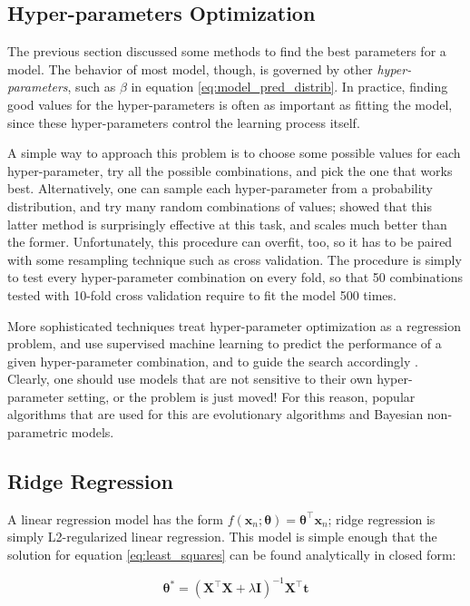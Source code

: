 \documentclass[a4paper,11pt]{kth-mag}
\begin{document}
\subsection{Hyper-parameters Optimization}
The previous section discussed some methods to find the best parameters for a model. The behavior of most model, though, is governed by other \emph{hyper-parameters}, such as $\beta$ in equation \ref{eq:model_pred_distrib}. In practice, finding good values for the hyper-parameters is often as important as fitting the model, since these hyper-parameters control the learning process itself.

A simple way to approach this problem is to choose some possible values for each hyper-parameter, try all the possible combinations, and pick the one that works best. Alternatively, one can sample each hyper-parameter from a probability distribution, and try many random combinations of values; \cite{random_search} showed that this latter method is surprisingly effective at this task, and scales much better than the former. Unfortunately, this procedure can overfit, too, so it has to be paired with some resampling technique such as cross validation. The procedure is simply to test every hyper-parameter combination on every fold, so that 50 combinations tested with 10-fold cross validation require to fit the model 500 times.

More sophisticated techniques treat hyper-parameter optimization as a regression problem, and use supervised machine learning to predict the performance of a given hyper-parameter combination, and to guide the search accordingly \citep{hyperopt}. Clearly, one should use models that are not sensitive to their own hyper-parameter setting, or the problem is just moved! For this reason, popular algorithms that are used for this are evolutionary algorithms and Bayesian non-parametric models.

\subsection{Ridge Regression}
\label{sec:ridge}
A linear regression model has the form $f(\bm x_n;\bm\theta)=\bm\theta^\intercal\bm x_n$; ridge regression is simply L2-regularized linear regression. This model is simple enough that the solution for equation \ref{eq:least_squares} can be found analytically in closed form:

\begin{equation}
\label{eq:ridge_solution}
\bm\theta^*=(\bm X^\intercal\bm X+\lambda\bm I)^{-1}\bm X^\intercal\bm t
\end{equation}
\end{document}
